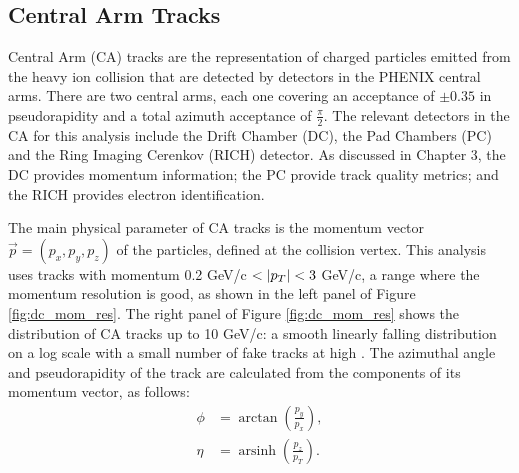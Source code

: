 \subsection{Central Arm Tracks}
Central Arm (CA) tracks are the representation of charged particles emitted from the heavy ion collision that are detected by detectors in the PHENIX central arms. There are two central arms, each one covering an acceptance of $\pm 0.35$ in pseudorapidity and a total azimuth acceptance of $\frac{\pi}{2}$. The relevant detectors in the CA for this analysis include the Drift Chamber (DC), the Pad Chambers (PC) and the Ring Imaging Cerenkov (RICH) detector. As discussed in Chapter 3, the DC provides momentum information; the PC provide track quality metrics; and the RICH provides electron identification. 

The main physical parameter of CA tracks is the momentum vector $\vec{p} = (p_x, p_y, p_z)$ of the particles, defined at the collision vertex. This analysis uses tracks with momentum 0.2 GeV/c $< |\mbox{$p_T$}| < 3$ GeV/c, a \pt range where the momentum resolution is good, as shown in the left panel of Figure \ref{fig:dc_mom_res}. The right panel of Figure \ref{fig:dc_mom_res} shows the \pt distribution of CA tracks up to 10 GeV/c: a smooth linearly falling distribution on a log scale with a small number of fake tracks at high \pt. The azimuthal angle and pseudorapidity of the track are calculated from the components of its momentum vector, as follows: 
\begin{align}
\phi &= \arctan( \frac{p_y}{p_x} ),\\
\eta &= \operatorname{arsinh}(\frac{p_z}{p_T}). 
\label{eqn:phi_eta_form}
\end{align}


